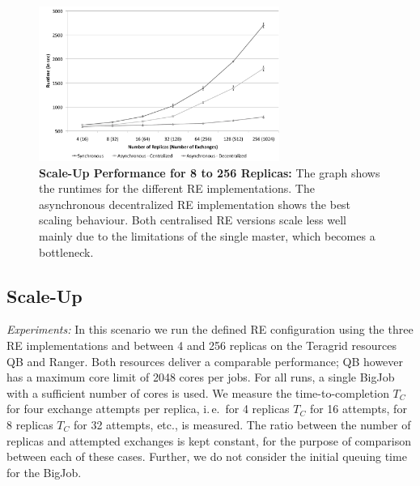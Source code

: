 \documentclass{rspublic}
\begin{document}

%
\begin{figure}
\centering
\includegraphics[width=0.7\textwidth]{../data/scale_up.pdf}
\caption{\small \textbf{Scale-Up Performance for 8 to 256 Replicas:} 
  The graph shows the runtimes for the different RE implementations.
  The asynchronous decentralized RE implementation shows the best
  scaling behaviour. Both centralised RE versions scale less well mainly due
  to the limitations of the single master, which becomes a bottleneck.}
\label{fig:graph}
\vspace{-1em}
\end{figure}

\subsection{Scale-Up}

{\it Experiments: }
In this scenario we run the defined RE configuration using the three RE implementations 
and between 4 and 256 replicas on the Teragrid resources QB and Ranger.
Both resources deliver a comparable performance; QB however has a maximum
core limit of 2048 cores per jobs. For all runs, a single BigJob with a 
sufficient number of cores is used. 
We measure the time-to-completion $T_{C}$ for four 
exchange attempts per replica, i.\,e.\ for 4 replicas $T_{C}$
for 16 attempts, for 8 replicas $T_{C}$ for 32 attempts,
etc., is measured. The ratio between the number of
replicas and attempted exchanges is kept constant, for
the purpose of comparison between each of these cases. Further,
we do not consider the initial queuing time for the BigJob.
\end{document}
